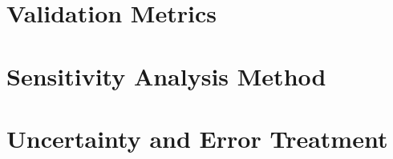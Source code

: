 \section{Validation Metrics}
\label{sec:validation-metrics}


\section{Sensitivity Analysis Method}
\label{sec:sensitivity-method}

%

\section{Uncertainty and Error Treatment}
\label{sec:uncertainty-method}


